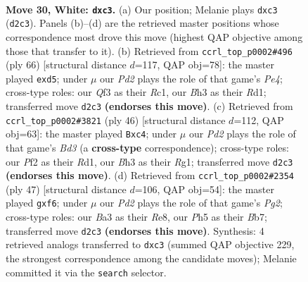 \documentclass[11pt]{article}
\begin{document}
\clearpage

\begin{figure}[p]\centering
\begin{subfigure}{0.46\textwidth}\centering
\resizebox{\linewidth}{!}{%
\newchessgame
\chessboard[
  setfen={r3r2k/bp1b1pp1/p3p3/7P/3q4/BPnp1Q1B/P2P1PKP/R3R3 w - - 0 30},
  showmover=false,
  pgfstyle=straightmove, color=movearrow, markmove={d2-c3}
]}
\caption{}
\end{subfigure}\hfill
\begin{subfigure}{0.46\textwidth}\centering
\resizebox{\linewidth}{!}{%
\newchessgame
\chessboard[
  setfen={3r2k1/2r1qpp1/p7/2pb2np/3pP3/Q6P/PP3PP1/2RR1BK1 w - - 0 34},
  showmover=false,
  pgfstyle=straightmove, color=movearrow, markmove={e4-d5}
]}
\caption{}
\end{subfigure}
\\[4pt]
\begin{subfigure}{0.46\textwidth}\centering
\resizebox{\linewidth}{!}{%
\newchessgame
\chessboard[
  setfen={r3qrk1/1pQ2pb1/4b1p1/p6p/2n1PB1P/3B1P2/PP2NP2/3RK1R1 w - - 1 24},
  showmover=false,
  pgfstyle=straightmove, color=movearrow, markmove={d3-c4}
]}
\caption{}
\end{subfigure}\hfill
\begin{subfigure}{0.46\textwidth}\centering
\resizebox{\linewidth}{!}{%
\newchessgame
\chessboard[
  setfen={4r1k1/1brq1ppp/4pB2/p7/Pp1P4/3Q1P2/1PB3PP/2RR2K1 b - - 0 24},
  showmover=false,
  pgfstyle=straightmove, color=movearrow, markmove={g7-f6}
]}
\caption{}
\end{subfigure}
\caption{\textbf{Move 30, White: \texttt{dxc3}.} (a) Our position; Melanie plays \texttt{dxc3} (\texttt{d2c3}). Panels (b)--(d) are the retrieved master positions whose correspondence most drove this move (highest QAP objective among those that transfer to it). (b) Retrieved from \texttt{ccrl\_top\_p0002\#496} (ply 66) [structural distance $d$=117, QAP obj=78]: the master played \texttt{exd5}; under $\mu$ our \emph{Pd2} plays the role of that game's \emph{Pe4}; cross-type roles: our \emph{Q}f3 as their \emph{R}c1, our \emph{B}h3 as their \emph{R}d1; transferred move \texttt{d2c3} \textbf{(endorses this move)}. (c) Retrieved from \texttt{ccrl\_top\_p0002\#3821} (ply 46) [structural distance $d$=112, QAP obj=63]: the master played \texttt{Bxc4}; under $\mu$ our \emph{Pd2} plays the role of that game's \emph{Bd3} (a \textbf{cross-type} correspondence); cross-type roles: our \emph{P}f2 as their \emph{R}d1, our \emph{B}h3 as their \emph{R}g1; transferred move \texttt{d2c3} \textbf{(endorses this move)}. (d) Retrieved from \texttt{ccrl\_top\_p0002\#2354} (ply 47) [structural distance $d$=106, QAP obj=54]: the master played \texttt{gxf6}; under $\mu$ our \emph{Pd2} plays the role of that game's \emph{Pg2}; cross-type roles: our \emph{B}a3 as their \emph{R}e8, our \emph{P}h5 as their \emph{B}b7; transferred move \texttt{d2c3} \textbf{(endorses this move)}. Synthesis: 4 retrieved analogs transferred to \texttt{dxc3} (summed QAP objective 229, the strongest correspondence among the candidate moves); Melanie committed it via the \texttt{search} selector.}
\label{fig:thought-m58}
\end{figure}
\end{document}

